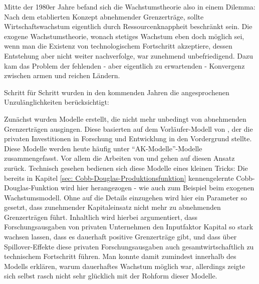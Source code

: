 Mitte der 1980er Jahre befand sich die Wachstumstheorie also in einem Dilemma: Nach dem etablierten Konzept abnehmender Grenzerträge, sollte Wirtschaftswachstum eigentlich durch Ressourcenknappheit beschränkt sein. Die exogene Wachstumstheorie, wonach stetiges Wachstum eben doch möglich sei, wenn man die Existenz von technologischem Fortschritt akzeptiere, dessen Entstehung aber nicht weiter nachverfolge, war zunehmend unbefriedigend. Dazu kam das Problem der fehlenden - aber eigentlich zu erwartenden - Konvergenz zwischen armen und reichen Ländern. 

Schritt für Schritt wurden in den kommenden Jahren die angesprochenen Unzulänglichkeiten berücksichtigt:

Zunächst wurden Modelle erstellt, die nicht mehr unbedingt von abnehmenden Grenzerträgen ausgingen. Diese basierten auf dem Vorläufer-Modell von \textcite{Arrow1962}, der die privaten Investitionen in Forschung und Entwicklung in den Vordergrund stellte. Diese Modelle werden heute häufig unter "`AK-Modelle"'-Modelle zusammengefasst. Vor allem die Arbeiten von \textcite{Romer1986} und \textcite{Rebelo1991} gehen auf diesen Ansatz zurück. Technisch gesehen bedienen sich diese Modelle eines kleinen Tricks: Die bereits in Kapitel \ref{sec: Cobb-Douglas-Produktionsfunktion} kennengelernte Cobb-Douglas-Funktion wird hier herangezogen - wie auch zum Beispiel beim exogenen Wachstumsmodell. Ohne auf die Details einzugehen wird hier ein Parameter so gesetzt, dass zunehmender Kapitaleinsatz nicht mehr zu abnehmenden Grenzerträgen führt. Inhaltlich wird hierbei argumentiert\parencite{Romer1994}, dass Forschungsausgaben von privaten Unternehmen den Inputfaktor Kapital so stark wachsen lassen, dass es dauerhaft positive Grenzerträge gibt, und dass über Spillover-Effekte diese privaten Forschungsausgaben auch gesamtwirtschaftlich zu technischem Fortschritt führen. Man konnte damit zumindest innerhalb des Modells erklären, warum dauerhaftes Wachstum möglich war, allerdings zeigte sich \textcite[S. 15]{Romer1994} selbst rasch nicht sehr glücklich mit der Rohform dieser Modelle.

